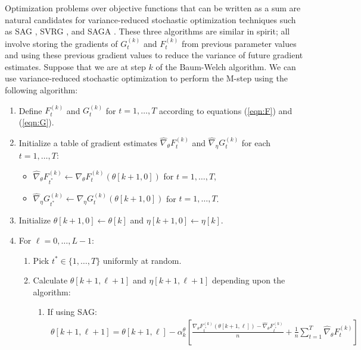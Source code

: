 Optimization problems over objective functions that can be written as a sum are natural candidates for variance-reduced stochastic optimization techniques such as SAG \citep{Schmidt:2017}, SVRG \citep{Johnson:2013}, and SAGA \citep{Defazio:2014}. These three algorithms are similar in spirit; all involve storing the gradients of $G_t^{(k)}$ and $F_t^{(k)}$ from previous parameter values and using these previous gradient values to reduce the variance of future gradient estimates. Suppose that we are at step $k$ of the Baum-Welch algorithm. We can use variance-reduced stochastic optimization to perform the M-step using the following algorithm:

\begin{enumerate}
    \item Define $F_t^{(k)}$ and $G_t^{(k)}$ for $t = 1, \ldots, T$ according to equations (\ref{eqn:F}) and (\ref{eqn:G}).
    \item Initialize a table of gradient estimates $\widehat \nabla_\theta F_t^{(k)}$ and $\widehat \nabla_\eta G_t^{(k)}$ for each $t = 1,\ldots,T$:
    \begin{itemize}
        \item $\widehat \nabla_\theta F_{t^*}^{(k)} \leftarrow \nabla_\theta F_{t}^{(k)}(\theta[k+1,0])$ for $t = 1,\ldots,T$,
        \item $\widehat \nabla_\eta G_{t^*}^{(k)} \leftarrow \nabla_\eta G_{t}^{(k)}(\theta[k+1,0])$ for $t = 1,\ldots,T$.
    \end{itemize}
    \item Initialize $\theta[k+1,0] \leftarrow \theta[k]$ and $\eta[k+1,0] \leftarrow \eta[k]$.
    \item For $\ell = 0,\ldots,L-1$:
    \begin{enumerate}
        \item Pick $t^* \in \{1,\ldots,T\}$ uniformly at random.
        \item Calculate $\theta[k+1,\ell+1]$ and $\eta[k+1,\ell+1]$ depending upon the algorithm:
        \begin{enumerate}
            \item If using SAG:
            \begin{gather}
                \theta[k+1,\ell+1] = \theta[k+1,\ell] - \alpha^{\theta}_k \left[\frac{\nabla_\theta F_{t^*}^{(k)}(\theta[k+1,\ell]) - \widehat \nabla_\theta F_{t^*}^{(k)}}{n} + \frac{1}{n} \sum_{t=1}^T \widehat \nabla_\theta F^{(k)}_{t} \right] \\

\end{gather}
\end{enumerate}
\end{enumerate}
\end{enumerate}
